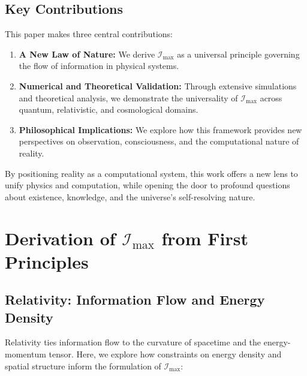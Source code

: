 \documentclass[12pt]{article}
\begin{document}
\subsection{Key Contributions}

This paper makes three central contributions:
\begin{enumerate}
    \item \textbf{A New Law of Nature:} We derive $\mathcal{I}_{\text{max}}$ as a universal principle governing the flow of information in physical systems.
    \item \textbf{Numerical and Theoretical Validation:} Through extensive simulations and theoretical analysis, we demonstrate the universality of $\mathcal{I}_{\text{max}}$ across quantum, relativistic, and cosmological domains.
    \item \textbf{Philosophical Implications:} We explore how this framework provides new perspectives on observation, consciousness, and the computational nature of reality.
\end{enumerate}

By positioning reality as a computational system, this work offers a new lens to unify physics and computation, while opening the door to profound questions about existence, knowledge, and the universe’s self-resolving nature.


\section{Derivation of \(\mathcal{I}_{\text{max}}\) from First Principles}

\subsection{Relativity: Information Flow and Energy Density}
Relativity ties information flow to the curvature of spacetime and the energy-momentum tensor. Here, we explore how constraints on energy density and spatial structure inform the formulation of \(\mathcal{I}_{\text{max}}\):
\end{document}
